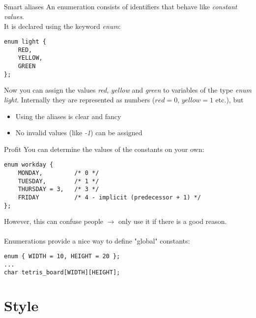 \subsection{}
\begin{frame}[fragile]{Smart aliases}
	An enumeration consists of identifiers that behave like \textit{constant values}. \\
	It is declared using the keyword \textit{enum}:
	\begin{lstlisting}[numbers=none]
enum light {
	RED,
	YELLOW,
	GREEN
};
\end{lstlisting}
	Now you can assign the values \textit{red}, \textit{yellow} and \textit{green} to variables of the type \textit{enum light}. Internally they are represented as numbers ($red = 0$, $yellow = 1$ etc.), but
	\begin{itemize}
		\item Using the aliases is clear and fancy
		\item No invalid values (like \textit{-1}) can be assigned
	\end{itemize}
\end{frame}
\begin{frame}[fragile]{Profit}
	You can determine the values of the constants on your own:
	\begin{lstlisting}[numbers=none]
enum workday {
	MONDAY,			/* 0 */
	TUESDAY,		/* 1 */
	THURSDAY = 3,	/* 3 */
	FRIDAY			/* 4 - implicit (predecessor + 1) */
};
\end{lstlisting}
	However, this can confuse people $\rightarrow$ only use it if there is a good reason. \\ \ \\
	Enumerations provide a nice way to define "global" constants:
	\begin{lstlisting}[numbers=none]
enum { WIDTH = 10, HEIGHT = 20 };
...
char tetris_board[WIDTH][HEIGHT];
\end{lstlisting}
\end{frame}

\section{Style}
